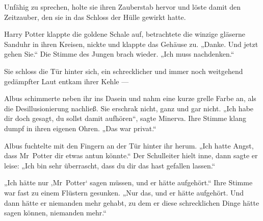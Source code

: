 Unfähig zu sprechen, holte sie ihren Zauberstab hervor und löste damit den Zeitzauber, den sie in das Schloss der Hülle gewirkt hatte.

Harry Potter klappte die goldene Schale auf, betrachtete die winzige gläserne Sanduhr in ihren Kreisen, nickte und klappte das Gehäuse zu.
„Danke. Und jetzt gehen Sie.“ Die Stimme des Jungen brach wieder.
„Ich muss nachdenken.“

\later

Sie schloss die Tür hinter sich, ein schrecklicher und immer noch weitgehend gedämpfter Laut entkam ihrer Kehle —


Albus schimmerte neben ihr ins Dasein und nahm eine kurze grelle Farbe an, als die Desillusionierung nachließ. Sie erschrak nicht, ganz und gar nicht.
„Ich habe dir doch gesagt, du sollst damit aufhören“, sagte Minerva. Ihre Stimme klang dumpf in ihren eigenen Ohren.
„Das war privat.“

Albus fuchtelte mit den Fingern an der Tür hinter ihr herum.
„Ich hatte Angst, dass Mr~Potter dir etwas antun könnte.“ Der Schulleiter hielt inne, dann sagte er leise:
„Ich bin sehr überrascht, dass du dir das hast gefallen lassen.“

„Ich hätte nur ‚Mr~Potter‘ sagen müssen, und er hätte aufgehört.“ Ihre Stimme war fast zu einem Flüstern gesunken.
„Nur das, und er hätte aufgehört. Und dann hätte er niemanden mehr gehabt, zu dem er diese schrecklichen Dinge hätte sagen können, niemanden mehr.“

